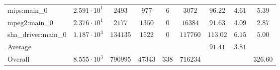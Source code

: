\begin{tabular}{|l|c|c|c|c|c|c|c|c|}
mips:main\_0            & $ 2.591 \cdot 10^{1} $ & $ 2493   $ & $ 977   $ & $ 6   $ & $ 3072   $ & $ 96.22       $ & $ 4.61    $ & $ 5.39    $ \\
mpeg2:main\_0           & $ 2.376 \cdot 10^{1} $ & $ 2177   $ & $ 1350  $ & $ 0   $ & $ 16384  $ & $ 91.63       $ & $ 4.09    $ & $ 2.87    $ \\
sha\_driver:main\_0     & $ 1.187 \cdot 10^{3} $ & $ 134135 $ & $ 1522  $ & $ 0   $ & $ 117760 $ & $ 113.02      $ & $ 6.15    $ & $ 5.00    $ \\
\hline
Average                 & $                    $ & $        $ & $       $ & $     $ & $        $ & $ 91.41       $ & $ 3.81    $ & $         $ \\
\hline
Overall                 & $ 8.555 \cdot 10^{3} $ & $ 790995 $ & $ 47343 $ & $ 338 $ & $ 716234 $ & $             $ & $         $ & $ 326.60  $ \\
\hline
\end{tabular}

